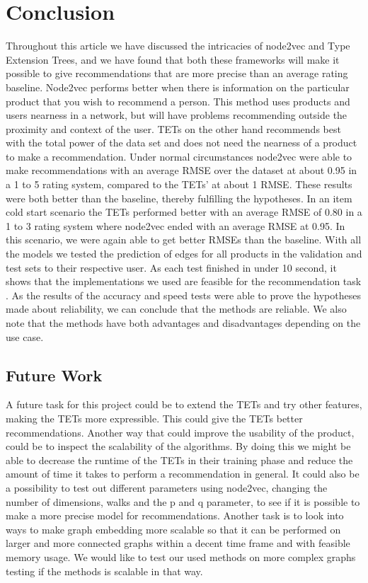 \section{Conclusion}
Throughout this article we have discussed the intricacies of node2vec and Type Extension Trees, and we have found that both these frameworks will make it possible to give recommendations that are more precise than an average rating baseline.
Node2vec performs better when there is information on the particular product that you wish to recommend a person.
This method uses products and users nearness in a network, but will have problems recommending outside the proximity and context of the user.
TETs on the other hand recommends best with the total power of the data set and does not need the nearness of a product to make a recommendation.
Under normal circumstances node2vec were able to make recommendations with an average RMSE over the dataset at about 0.95 in a 1 to 5 rating system, compared to the TETs' at about 1 RMSE.
These results were both better than the baseline, thereby fulfilling the hypotheses.
In an item cold start scenario the TETs performed better with an average RMSE of 0.80 in a 1 to 3 rating system where node2vec ended with an average RMSE at 0.95.
In this scenario, we were again able to get better RMSEs than the baseline.
With all the models we tested  the prediction of edges for all products in the validation and test sets to their respective user.
As each test finished in under 10 second, it shows that the implementations we used are feasible for the recommendation task .
As the results of the accuracy and speed tests were able to prove the hypotheses made about reliability, we can conclude that the methods are reliable.
We also note that the methods have both advantages and disadvantages depending on the use case. 

\subsection{Future Work}
A future task for this project could be to extend the TETs and try other features, making the TETs more expressible. This could give the TETs better recommendations.
Another way that could improve the usability of the product, could be to inspect the scalability of the algorithms.
By doing this we might be able to decrease the runtime of the TETs in their training phase and reduce the amount of time it takes to perform a recommendation in general.
It could also be a possibility to test out different parameters using node2vec, changing the number of dimensions, walks and the p and q parameter, to see if it is possible to make a more precise model for recommendations.
Another task is to look into ways to make graph embedding more scalable so that it can be performed on larger and more connected graphs within a decent time frame and with feasible memory usage. 
We would like to test our used methods on more complex graphs testing if the methods is scalable in that way.
